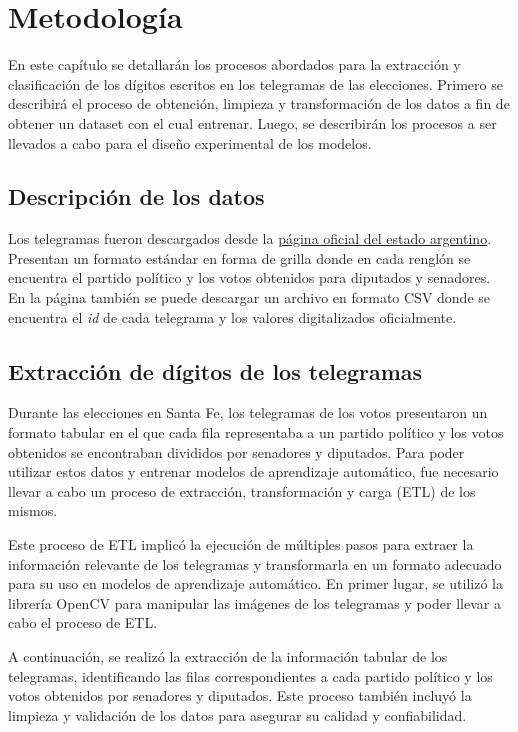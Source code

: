 \chapter{Metodología}

\label{Chapter3}

En este capítulo se detallarán los procesos abordados para la extracción y clasificación de los dígitos escritos en los
telegramas de las elecciones. Primero se describirá el proceso de obtención, limpieza y transformación de los datos a
fin de obtener un dataset con el cual entrenar. Luego, se describirán los procesos a ser llevados a cabo para el diseño
experimental de los modelos.

\section{Descripción de los datos}

Los telegramas fueron descargados desde la \href{https://op.elecciones.gob.ar/telegramas/generales2021/}{página oficial
    del estado argentino}. Presentan un formato estándar en forma de grilla donde en cada renglón se encuentra el partido
político y los votos obtenidos para diputados y senadores. En la página también se puede descargar un archivo en
formato CSV donde se encuentra el {\it id} de cada telegrama y los valores digitalizados oficialmente.

\section{Extracción de dígitos de los telegramas}

Durante las elecciones en Santa Fe, los telegramas de los votos presentaron un formato tabular en el que cada fila
representaba a un partido político y los votos obtenidos se encontraban divididos por senadores y diputados. Para poder
utilizar estos datos y entrenar modelos de aprendizaje automático, fue necesario llevar a cabo un proceso de
extracción, transformación y carga (ETL) de los mismos.

Este proceso de ETL implicó la ejecución de múltiples pasos para extraer la información relevante de los telegramas y
transformarla en un formato adecuado para su uso en modelos de aprendizaje automático. En primer lugar, se utilizó la
librería OpenCV \parencite{opencv_library} para manipular las imágenes de los telegramas y poder llevar a cabo el proceso de ETL.

A continuación, se realizó la extracción de la información tabular de los telegramas, identificando las filas
correspondientes a cada partido político y los votos obtenidos por senadores y diputados. Este proceso también incluyó
la limpieza y validación de los datos para asegurar su calidad y confiabilidad.

